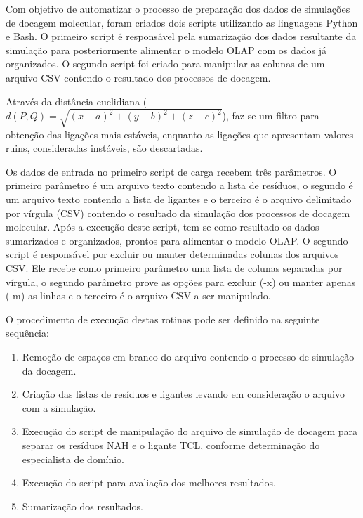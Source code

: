 Com objetivo de automatizar o processo de preparação dos dados de simulações de docagem molecular, foram criados dois scripts utilizando as linguagens Python e Bash. O primeiro script é responsável pela sumarização dos dados resultante da simulação para posteriormente alimentar o modelo OLAP com os dados já organizados. O segundo script foi criado para manipular as colunas de um arquivo CSV contendo o resultado dos processos de docagem.

Através da distância euclidiana ($d(P, Q)= \sqrt{(x - a)^{2} +(y - b)^{2} + (z - c)^{2}}$), faz-se um filtro para obtenção das ligações mais estáveis, enquanto as ligações que apresentam valores ruins, consideradas instáveis, são descartadas.

Os dados de entrada no primeiro script de carga recebem três parâmetros. O primeiro parâmetro é um arquivo texto contendo a lista de resíduos, o segundo é um arquivo texto contendo a lista de ligantes e o terceiro é o arquivo delimitado por vírgula (CSV) contendo o resultado da simulação dos processos de docagem molecular. Após a execução deste script, tem-se como resultado os dados sumarizados e organizados, prontos para alimentar o modelo OLAP. O segundo script é responsável por excluir ou manter determinadas colunas dos arquivos CSV. Ele recebe como primeiro parâmetro uma lista de colunas separadas por vírgula, o segundo parâmetro prove as opções para excluir (-x) ou manter apenas (-m) as linhas e o terceiro é o arquivo CSV a ser manipulado.

O procedimento de execução destas rotinas pode ser definido na seguinte sequência:

\begin{enumerate}
    \item Remoção de espaços em branco do arquivo contendo o processo de simulação da docagem. 
    \item Criação das listas de resíduos e ligantes levando em consideração o arquivo com a simulação.
    \item Execução do script de manipulação do arquivo de simulação de docagem para separar os resíduos NAH e o ligante TCL, conforme determinação do especialista de domínio.
    \item Execução do script para avaliação dos melhores resultados.
    \item Sumarização dos resultados.
\end{enumerate}


